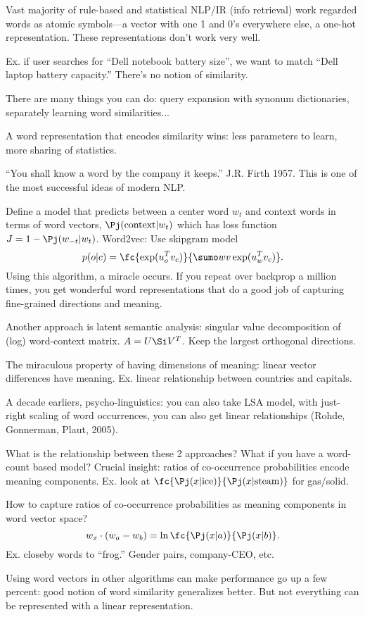 Vast majority of rule-based and statistical NLP/IR (info retrieval) work regarded words as atomic symbols---a vector with one 1 and 0's everywhere else, a one-hot representation. These representations don't work very well.

Ex. if user searches for ``Dell notebook battery size'', we want to match ``Dell laptop battery capacity.'' There's no notion of similarity.

There are many things you can do: query expansion with synonum dictionaries, separately learning word similarities...

A word representation that encodes similarity wins: less parameters to learn, more sharing of statistics.

``You shall know a word by the company it keeps.'' J.R. Firth 1957.
This is one of the most successful ideas of modern NLP.

Define a model that predicts between a center word $w_t$ and context words in terms of word vectors, $\Pj(\text{context}|w_t)$ which has loss function $J=1-\Pj(w_{-t}|w_t)$. 
Word2vec: Use skipgram model
$$
p(o|c) = \fc{\exp(u_o^Tv_c)}{\sumo wv \exp(u_w^T v_c)}.
$$
Using this algorithm, a miracle occurs. If you repeat over backprop a million times, you get wonderful word representations that do a good job of capturing fine-grained directions and meaning.

Another approach is latent semantic analysis: singular value decomposition of (log) word-context matrix. $A=U\Si V^T$. 
Keep the largest orthogonal directions.

The miraculous property of having dimensions of meaning: linear vector differences have meaning. Ex. linear relationship between countries and capitals.

A decade earliers, psycho-linguistics: you can also take LSA model, with just-right scaling of word occurrences, you can also get linear relationships (Rohde, Gonnerman, Plaut, 2005). 

What is the relationship between these 2 approaches? What if you have a word-count based model? 
Crucial insight: ratios of co-occurrence probabilities  encode meaning components. Ex. look at $\fc{\Pj(x|\text{ice})}{\Pj(x|\text{steam})}$ for gas/solid.

How to capture ratios of co-occurrence probabilities as meaning components in word vector space? 
$$
w_x \cdot (w_a-w_b) = \ln \fc{\Pj(x|a)}{\Pj(x|b)}.
$$ 
Ex. closeby words to ``frog.'' Gender pairs, company-CEO, etc.

Using word vectors in other algorithms can make performance go up a few percent: good notion of word similarity generalizes better. But not everything can be represented with a linear representation. 

